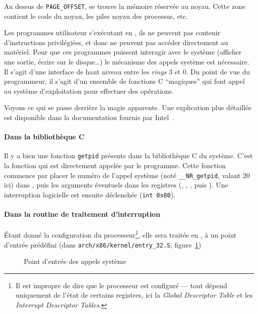 
Au dessus de \texttt{PAGE\_OFFSET}, se trouve la mémoire réservée au noyau.
Cette zone contient le code du noyau, les piles noyau des processus, etc.

\label{sec:impl-syscall}

Les programmes utilisateur s'exécutant en , ils ne peuvent pas contenir
d'instructions privilégiées, et donc ne peuvent pas accéder directement au
matériel. Pour que ces programmes puissent interagir avec le système (afficher
une sortie, écrire sur le disque…) le mécanisme des appels système est
nécessaire. Il s'agit d'une interface de haut niveau entre les \emph{rings} 3 et
0. Du point de vue du programmeur, il s'agit d'un ensemble de fonctions C
\enquote{magiques} qui font appel au système d'exploitation pour effectuer des
opérations.

Voyons ce qui se passe derrière la magie apparente. Une explication plus
détaillée est disponible dans la documentation fournie par
Intel~\cite{intelsys}.

\paragraph{Dans la bibliothèque C}

Il y a bien une fonction \texttt{getpid} présente dans la bibliothèque C du
système. C'est la fonction qui est directement appelée par le programme. Cette
fonction commence par placer le numéro de l'appel système (noté
\texttt{\_\_NR\_getpid}, valant 20 ici) dans \eax, puis les arguments éventuels
dans les registres (\ebx, \ecx, \edx, \esi{} puis \edi). Une interruption
logicielle est ensuite déclenchée (\verb!int 0x80!).

\paragraph{Dans la routine de traitement d'interruption}

Étant donné la configuration du processeur\footnote{Il est impropre de dire que
le processeur est configuré --- tout dépend uniquement de l'état de certains
registres, ici la \emph{Global Descriptor Table} et les \emph{Interrupt
Descriptor Tables}.}, elle sera traitée en , à un point d'entrée
prédéfini (dans \verb!arch/x86/kernel/entry_32.S!,
figure~\ref{fig:entry-syscall})

\begin{figure}[h]
    \caption{Point d'entrée des appels système}
    \label{fig:entry-syscall}
\end{figure}

